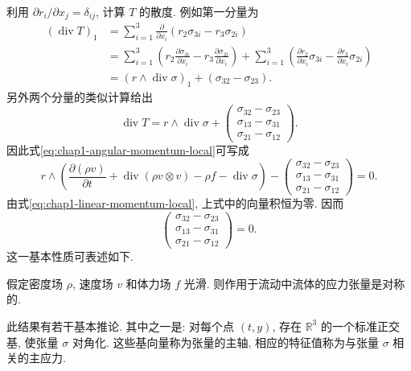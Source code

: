 利用 $\partial r_i/\partial x_j=\delta_{ij}$, 计算 $T$ 的散度. 例如第一分量为
\begin{align*}
(\operatorname{div}T)_1
&=\sum_{i=1}^3\frac{\partial}{\partial x_i}(r_2\sigma_{3i}-r_3\sigma_{2i})\\
&=\sum_{i=1}^3\left(r_2\frac{\partial\sigma_{3i}}{\partial x_i}-r_3\frac{\partial\sigma_{2i}}{\partial x_i}\right)
+\sum_{i=1}^3\left(\frac{\partial r_2}{\partial x_i}\sigma_{3i}-\frac{\partial r_3}{\partial x_i}\sigma_{2i}\right)\\
&=(r\wedge\operatorname{div}\sigma)_1+(\sigma_{32}-\sigma_{23}).
\end{align*}
另外两个分量的类似计算给出
\[
  \operatorname{div}T=r\wedge\operatorname{div}\sigma
  +\begin{pmatrix}\sigma_{32}-\sigma_{23}\\\sigma_{13}-\sigma_{31}\\\sigma_{21}-\sigma_{12}\end{pmatrix}.
\]
因此式\eqref{eq:chap1-angular-momentum-local}可写成
\[
r\wedge\left(\frac{\partial(\rho v)}{\partial t}+\operatorname{div}(\rho v\otimes v)-\rho f-\operatorname{div}\sigma\right)
-\begin{pmatrix}\sigma_{32}-\sigma_{23}\\\sigma_{13}-\sigma_{31}\\\sigma_{21}-\sigma_{12}\end{pmatrix}=0.
\]
由式\eqref{eq:chap1-linear-momentum-local}, 上式中的向量积恒为零. 因而
\[
  \begin{pmatrix}\sigma_{32}-\sigma_{23}\\\sigma_{13}-\sigma_{31}\\\sigma_{21}-\sigma_{12}\end{pmatrix}=0.
\]
这一基本性质可表述如下.

\begin{Theorem}
\label{thm:chap1-symmetric-stress}
假定密度场 $\rho$, 速度场 $v$ 和体力场 $f$ 光滑. 则作用于流动中流体的应力张量是对称的.
\end{Theorem}

此结果有若干基本推论. 其中之一是: 对每个点 $(t,y)$, 存在 $\mathbb{R}^3$ 的一个标准正交基, 使张量 $\sigma$ 对角化. 这些基向量称为张量的主轴, 相应的特征值称为与张量 $\sigma$ 相关的主应力.
